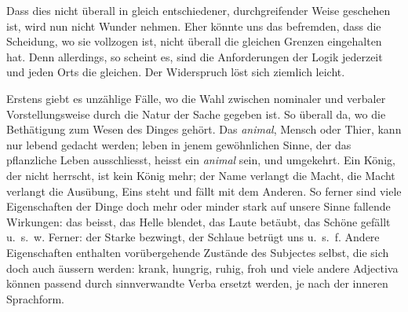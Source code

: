 Dass dies nicht überall in gleich entschiedener, durchgreifender Weise geschehen ist, wird nun nicht Wunder nehmen. Eher könnte uns das befremden, dass die Scheidung, wo sie vollzogen ist, nicht überall die gleichen Grenzen eingehalten hat. Denn allerdings, so scheint es, sind die Anforderungen der Logik jederzeit und jeden Orts die gleichen. Der Widerspruch löst sich ziemlich leicht.

Erstens giebt es unzählige Fälle, wo die Wahl zwischen nominaler und verbaler Vorstellungsweise durch die Natur der Sache gegeben ist. So überall da, wo die Bethätigung zum Wesen des Dinges gehört. Das \textit{animal}, Mensch oder Thier, kann nur lebend gedacht werden; leben in jenem gewöhnlichen Sinne, der das pflanzliche Leben ausschliesst, heisst ein \textit{animal} sein, und umgekehrt. Ein König, der nicht herrscht, ist kein König mehr; der Name verlangt die \label{sp.383} Macht, die Macht verlangt die Ausübung, Eins steht und fällt mit dem Anderen. So ferner sind viele Eigenschaften der Dinge doch mehr oder minder stark auf unsere Sinne fallende Wirkungen: das  beisst, das Helle blendet, das Laute betäubt, das Schöne gefällt u.~s.~w. Ferner: der Starke bezwingt, der Schlaue betrügt uns u.~s.~f. Andere Eigenschaften enthalten vorübergehende Zustände des Subjectes selbst, die sich doch auch äussern werden: krank, hungrig, ruhig, froh und viele andere Adjectiva können passend durch sinnverwandte Verba ersetzt werden, je nach der inneren Sprachform.


